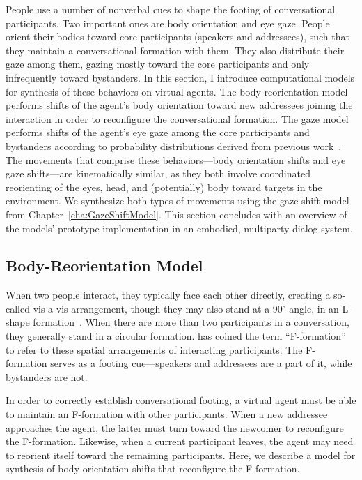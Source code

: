 People use a number of nonverbal cues to shape the footing of conversational participants. Two important ones are body orientation and eye gaze. People orient their bodies toward core participants (speakers and addressees), such that they maintain a conversational formation with them. They also distribute their gaze among them, gazing mostly toward the core participants and only infrequently toward bystanders.
In this section, I introduce computational models for synthesis of these behaviors on virtual agents.
The body reorientation model performs shifts of the agent's body orientation toward new addressees joining the interaction in order to reconfigure the conversational formation.
The gaze model performs shifts of the agent's eye gaze among the core participants and bystanders according to probability distributions derived from previous work~\citep{mutlu2012conversational}.
The movements that comprise these behaviors---body orientation shifts and eye gaze shifts---are kinematically similar, as they both involve coordinated reorienting of the eyes, head, and (potentially) body toward targets in the environment. We synthesize both types of movements using the gaze shift model from Chapter~\ref{cha:GazeShiftModel}. This section concludes with an overview of the models' prototype implementation in an embodied, multiparty dialog system.

\subsection{Body-Reorientation Model}

When two people interact, they typically face each other directly, creating a so-called vis-a-vis arrangement, though they may also stand at a 90$^\circ$ angle, in an L-shape formation~\citep{kendon1990conducting}. When there are more than two participants in a conversation, they generally stand in a circular formation. \citet{kendon1990conducting} has coined the term ``F-formation'' to refer to these spatial arrangements of interacting participants. The F-formation serves as a footing cue---speakers and addressees are a part of it, while bystanders are not.

In order to correctly establish conversational footing, a virtual agent must be able to maintain an F-formation with other participants. When a new addressee approaches the agent, the latter must turn toward the newcomer to reconfigure the F-formation. Likewise, when a current participant leaves, the agent may need to reorient itself toward the remaining participants. Here, we describe a model for synthesis of body orientation shifts that reconfigure the F-formation.

